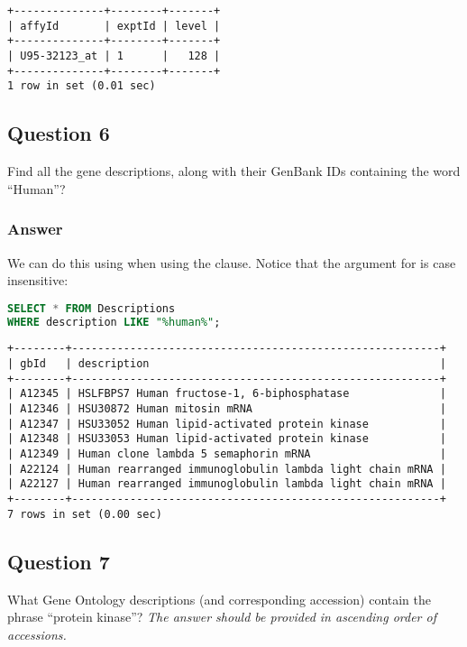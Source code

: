 \begin{lstlisting}[style=output]
+--------------+--------+-------+
| affyId       | exptId | level |
+--------------+--------+-------+
| U95-32123_at | 1      |   128 |
+--------------+--------+-------+
1 row in set (0.01 sec)
\end{lstlisting}

\subsection*{Question 6}
Find all the gene descriptions, along with their GenBank IDs containing the word “Human”?

\subsubsection*{Answer}
We can do this using  when using the  clause. Notice that the argument for  is case insensitive:

\begin{lstlisting}[language=sql]
SELECT * FROM Descriptions
WHERE description LIKE "%human%";
\end{lstlisting}

\begin{lstlisting}[style=output]
+--------+---------------------------------------------------------+
| gbId   | description                                             |
+--------+---------------------------------------------------------+
| A12345 | HSLFBPS7 Human fructose-1, 6-biphosphatase              |
| A12346 | HSU30872 Human mitosin mRNA                             |
| A12347 | HSU33052 Human lipid-activated protein kinase           |
| A12348 | HSU33053 Human lipid-activated protein kinase           |
| A12349 | Human clone lambda 5 semaphorin mRNA                    |
| A22124 | Human rearranged immunoglobulin lambda light chain mRNA |
| A22127 | Human rearranged immunoglobulin lambda light chain mRNA |
+--------+---------------------------------------------------------+
7 rows in set (0.00 sec)
\end{lstlisting}

\subsection*{Question 7}
What Gene Ontology descriptions (and corresponding accession) contain the phrase “protein kinase”? \emph{The answer should be provided in ascending order of accessions.}


